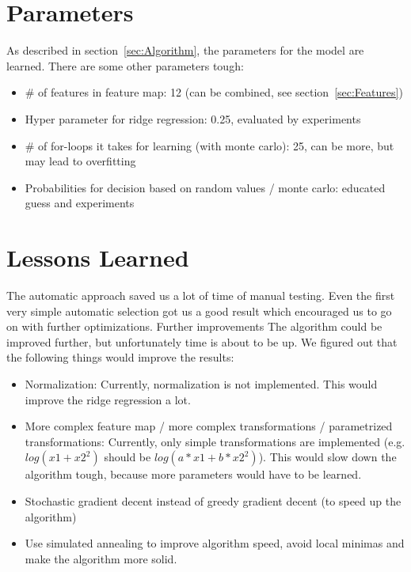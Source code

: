 \documentclass[a4paper, 11pt]{article}
\begin{document}
\section{Parameters}
\label{sec:Parameters}

As described in section~\ref{sec:Algorithm}, the parameters for the model are learned. There are some other parameters tough:
\begin{itemize}
\item \# of features in feature map: 12 (can be combined, see section~\ref{sec:Features})
\item Hyper parameter for ridge regression: 0.25, evaluated by experiments
\item \# of for-loops it takes for learning (with monte carlo): 25, can be more, but may lead to overfitting
\item Probabilities for decision based on random values / monte carlo: educated guess and experiments
\end{itemize}

\section{Lessons Learned}
The automatic approach saved us a lot of time of manual testing. Even the first very simple automatic selection got us a good result which encouraged us to go on with further optimizations.
Further improvements
The algorithm could be improved further, but unfortunately time is about to be up. We figured out that the following things would improve the results:
\begin{itemize}
\item Normalization: Currently, normalization is not implemented. This would improve the ridge regression a lot.
\item More complex feature map / more complex transformations / parametrized transformations: Currently, only simple transformations are implemented (e.g. $log(x1 + x2^2)$ should be $log(a*x1 + b*x2^2)$). This would slow down the algorithm tough, because more parameters would have to be learned.
\item Stochastic gradient decent instead of greedy gradient decent (to speed up the algorithm)
\item Use simulated annealing to improve algorithm speed, avoid local minimas and make the algorithm more solid.
\end{itemize}
\end{document}
